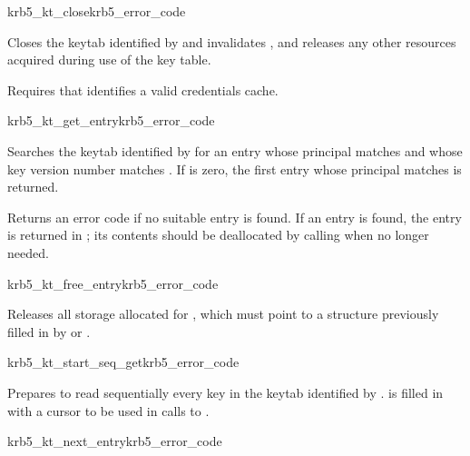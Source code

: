 \begin{funcdecl}{krb5_kt_close}{krb5_error_code}{\funcin}
\end{funcdecl}

Closes the keytab identified by  and invalidates
, and releases any other resources acquired during use of
the key table.

Requires that  identifies a valid credentials cache.

\begin{funcdecl}{krb5_kt_get_entry}{krb5_error_code}{\funcin}
\funcout
{}
\end{funcdecl}

Searches the keytab identified by  for an entry whose
principal matches  and
whose key version number matches .  If  is
zero, the first entry whose principal matches is returned.

Returns an error code if no suitable entry is found.  If an entry is
found, the entry is returned in ; its contents should
be deallocated by calling  when no longer
needed.

\begin{funcdecl}{krb5_kt_free_entry}{krb5_error_code}{\funcinout}
\end{funcdecl}

Releases all storage allocated for , which must point
to a structure previously filled in by  or
.

\begin{funcdecl}{krb5_kt_start_seq_get}{krb5_error_code}{\funcin}
\funcout
{}
\end{funcdecl}

Prepares to read sequentially every key in the keytab identified by
.
 is filled in with a cursor to be used in calls to
.

\begin{funcdecl}{krb5_kt_next_entry}{krb5_error_code}{\funcin}
\funcout
{}
\funcinout
{}
\end{funcdecl}

